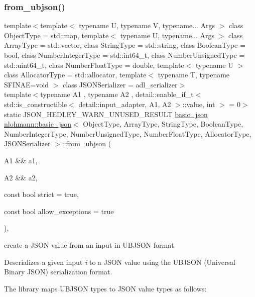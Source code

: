 \subsubsection{\texorpdfstring{from\+\_\+ubjson()}{from\_ubjson()}\hspace{0.1cm}{\footnotesize\ttfamily [2/2]}}
{\footnotesize\ttfamily template$<$template$<$ typename U, typename V, typename... Args $>$ class Object\+Type = std\+::map, template$<$ typename U, typename... Args $>$ class Array\+Type = std\+::vector, class String\+Type  = std\+::string, class Boolean\+Type  = bool, class Number\+Integer\+Type  = std\+::int64\+\_\+t, class Number\+Unsigned\+Type  = std\+::uint64\+\_\+t, class Number\+Float\+Type  = double, template$<$ typename U $>$ class Allocator\+Type = std\+::allocator, template$<$ typename T, typename S\+F\+I\+N\+A\+E=void $>$ class J\+S\+O\+N\+Serializer = adl\+\_\+serializer$>$ \\
template$<$typename A1 , typename A2 , detail\+::enable\+\_\+if\+\_\+t$<$ std\+::is\+\_\+constructible$<$ detail\+::input\+\_\+adapter, A1, A2 $>$\+::value, int $>$  = 0$>$ \\
static J\+S\+O\+N\+\_\+\+H\+E\+D\+L\+E\+Y\+\_\+\+W\+A\+R\+N\+\_\+\+U\+N\+U\+S\+E\+D\+\_\+\+R\+E\+S\+U\+LT \mbox{\hyperlink{classnlohmann_1_1basic__json}{basic\+\_\+json}} \mbox{\hyperlink{classnlohmann_1_1basic__json}{nlohmann\+::basic\+\_\+json}}$<$ Object\+Type, Array\+Type, String\+Type, Boolean\+Type, Number\+Integer\+Type, Number\+Unsigned\+Type, Number\+Float\+Type, Allocator\+Type, J\+S\+O\+N\+Serializer $>$\+::from\+\_\+ubjson (\begin{DoxyParamCaption}\item[{A1 \&\&}]{a1,  }\item[{A2 \&\&}]{a2,  }\item[{const bool}]{strict = {\ttfamily true},  }\item[{const bool}]{allow\+\_\+exceptions = {\ttfamily true} }\end{DoxyParamCaption})\hspace{0.3cm}{\ttfamily [inline]}, {\ttfamily [static]}}



create a J\+S\+ON value from an input in U\+B\+J\+S\+ON format 

Deserializes a given input {\itshape i} to a J\+S\+ON value using the U\+B\+J\+S\+ON (Universal Binary J\+S\+ON) serialization format.

The library maps U\+B\+J\+S\+ON types to J\+S\+ON value types as follows\+:

